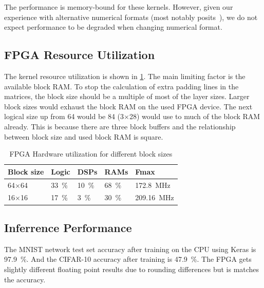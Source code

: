 \documentclass[techrep,english]{ipsj} %
\begin{document}
The performance is memory-bound for these kernels. However, given our experience with alternative numerical formats (most notably posits~\cite{podobasposit}), we do not expect performance to be degraded when changing numerical format.

\subsection{FPGA Resource Utilization}
The kernel resource utilization is shown in \cref{tab:fpga-util}.
The main limiting factor is the available block RAM.
To stop the calculation of extra padding lines in the matrices, the block size should be a multiple of most of the layer sizes.
Larger block sizes would exhaust the block RAM on the used FPGA device.
The next logical size up from \num{64} would be \num{84} (\num{3}\(\times\)\num{28}) would use to much of the block RAM already.
This is because there are three block buffers and the relationship between block size and used block RAM is square.

\begin{table}[h]
  \centering
  \caption{FPGA Hardware utilization for different block sizes}\label{tab:fpga-util}
  \begin{tabular}{lllll}
    \toprule
    \textbf{Block size} & \textbf{Logic} & \textbf{DSPs} & \textbf{RAMs} & \textbf{Fmax} \\
    \midrule    
    64$\times$64 & \SI{33}{\percent} & \SI{10}{\percent} & \SI{68}{\percent} & \SI{172.8}{\mega\hertz}  \\ %
    16$\times$16 & \SI{17}{\percent} & \SI{3}{\percent} & \SI{30}{\percent} & \SI{209.16}{\mega\hertz}  \\ %
    \bottomrule
  \end{tabular}
\end{table}

\subsection{Inferrence Performance}
The MNIST network test set accuracy after training on the CPU using Keras is \SI{97.9}{\percent}.
And the CIFAR-10 accuracy after training is \SI{47.9}{\percent}.
The FPGA gets slightly different floating point results due to rounding differences but is matches the accuracy.
\end{document}
